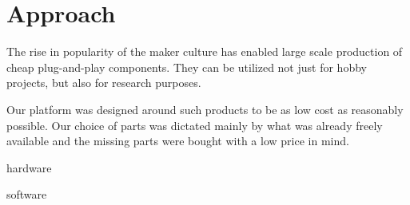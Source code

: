 \documentclass[class=report, crop=false]{standalone}
\begin{document}
\chapter{Approach}\label{cha:approach}

The rise in popularity of the maker culture has enabled large scale production of cheap plug-and-play components. They can be utilized not just for hobby projects, but also for research purposes.

Our platform was designed around such products to be as low cost as reasonably possible. Our choice of parts was dictated mainly by what was already freely available and the missing parts were bought with a low price in mind.

{hardware}

{software}
\end{document}
